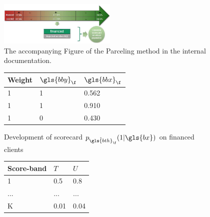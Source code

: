 \begin{figure}
\centering
\includegraphics[width=0.5\textwidth]{figures/appendix/processusParcelling.png}
\caption{The accompanying Figure of the Parceling method in the internal documentation.}
\label{fig:parceling}
\end{figure}


\begin{table}
\caption{\label{parcel} Example of implementation of the Parcelling method on a small dataset}
{\setlength{\parindent}{0cm}
\begin{multicols}{3}

\begin{subfigure}[t]{0.31\textwidth}
\begin{center}
\begin{adjustbox}{max width=\textwidth}
\begin{tabular}{l l l}
\toprule
\textbf{Weight} & \textbf{${\gls{bby}}_{\f}$} & \textbf{${\gls{bbx}}_{\f}$}\\
\midrule
1 & 1 & 0.562 \\
1 & 1 & 0.910 \\
1 & 0 & 0.430 \\
\bottomrule
\end{tabular}
\end{adjustbox}
\end{center}

\caption{Development of scorecard $p_{\hat{\gls{bth}}_\f}(1 | \gls{bx})$ on financed clients}
\label{parcel:sfig1}
\end{subfigure}

\columnbreak

\begin{subfigure}[t]{0.31\textwidth}
\begin{center}
\begin{adjustbox}{max width=\textwidth}
\begin{tabular}{l l l}
\toprule
\textbf{Score-band} & \textbf{$T$} &  \textbf{$U$} \\
\midrule
1 & 0.5 & 0.8 \\
... & ... & ... \\
K & 0.01 & 0.04 \\
\bottomrule
\end{tabular}
\end{adjustbox}
\end{center}


\end{subfigure}
\end{multicols}}
\end{table}
